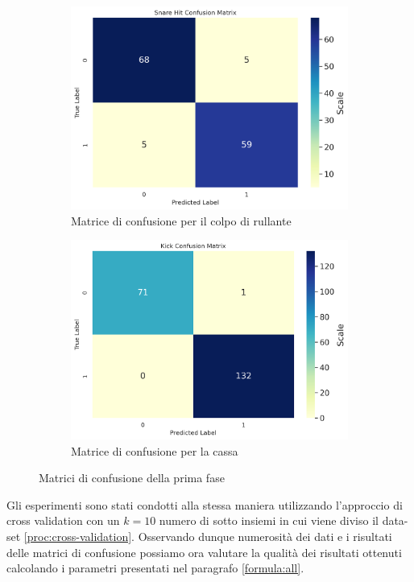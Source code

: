 \begin{figure}[h!]
	\begin{subfigure}{.5\linewidth}
		\includegraphics[width=\linewidth]{./immagini/first_classification/sn_hit_cm.png}
		\caption{Matrice di confusione per il colpo di rullante}
		\label{fig:cm_1c}
	\end{subfigure}\hfill
	\begin{subfigure}{.5\linewidth}
		\includegraphics[width=\linewidth]{./immagini/first_classification/kick_cm.png}
		\caption{Matrice di confusione per la cassa}
		\label{fig:cm_1d}
	\end{subfigure}
	\caption{Matrici di confusione della prima fase}
	\label{fig:cm_1}
\end{figure}

Gli esperimenti sono stati condotti alla stessa maniera utilizzando l'approccio di cross validation con un $k=10$ numero di sotto insiemi in cui viene diviso il data-set \ref{proc:cross-validation}.
Osservando dunque numerosità dei dati e i risultati delle matrici di confusione possiamo ora valutare la qualità dei risultati ottenuti calcolando i parametri presentati nel paragrafo \ref{formula:all}.\\

